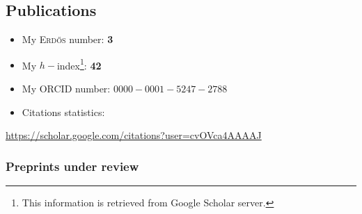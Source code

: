\documentclass[final, a4paper, oneside, 12pt]{article}
\numberwithin{equation}{section}
\begin{document}
\subsection{Publications}

\begin{itemize}
  \item My \textsc{Erd\H{o}s} number: \textbf{3}
  \item My $h-$index\footnote{This information is retrieved from Google Scholar server.}: \textbf{42}
  \item My ORCID number: $0000-0001-5247-2788$
\end{itemize}

\begin{itemize}
  \item Citations statistics:
\end{itemize}

\begin{center}
  \url{https://scholar.google.com/citations?user=cvOVca4AAAAJ}
\end{center}

\subsubsection{Preprints under review}
\end{document}
